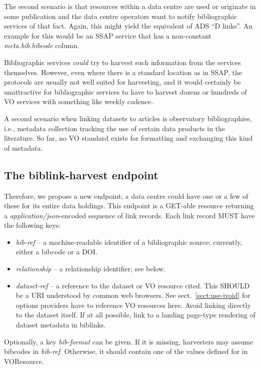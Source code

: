 \documentclass[11pt,a4paper]{ivoa}
\begin{document}
The second scenario is that resources within a data centre are used or
originate in some publication and the data centre operators want to
notify bibliographic services of that fact.  Again, this might yield the
equivalent of ADS ``D links''.  An example for this would be an SSAP
\citep{2012ivoa.spec.0210T} service that has a non-constant
\textsl{meta.bib.bibcode} column.

Bibliographic services \emph{could} try to harvest such information from
the services themselves.  However, even where there is a standard
location as in SSAP, the protocols are usually not well suited for
harvesting, and it would certainly be unattractive for bibliographic
services to have to harvest dozens or hundreds of VO services with
something like weekly cadence.

A second scenario when linking datasets to articles is observatory
bibliographies, i.e., metadata collection tracking the use of certain
data products in the literature.  So far, no VO standard exists for
formatting and exchanging this kind of metadata.


\subsection{The biblink-harvest endpoint}

Therefore, we propose a new endpoint; a data centre could have one or a
few of these for its entire data holdings.  This endpoint is a GET-able
resource returning a \textit{application/json}-encoded sequence of link
records.  Each link record MUST have the following keys:

\begin{itemize}
\item \textit{bib-ref} -- a machine-readable identifier of a bibliographic
source; currently, either a bibcode or a DOI.
\item \textit{relationship} -- a relationship identifier; see below.
\item \textit{dataset-ref} -- a reference to the dataset or VO resource cited.
This SHOULD be a URI understood by common web browsers.  See
sect.~\ref{sect:use-ivoid} for options providers have to reference VO
resources here.  Avoid linking directly to the dataset itself.  If at
all possible, link to a landing page-type rendering of dataset metadata
in biblinks.
\end{itemize}

Optionally, a key \textit{bib-format} can be given.  If it is missing,
harvesters may assume bibcodes in \textit{bib-ref}.  Otherwise, it should
contain one of the values defined for  in
VOResource.
\end{document}
